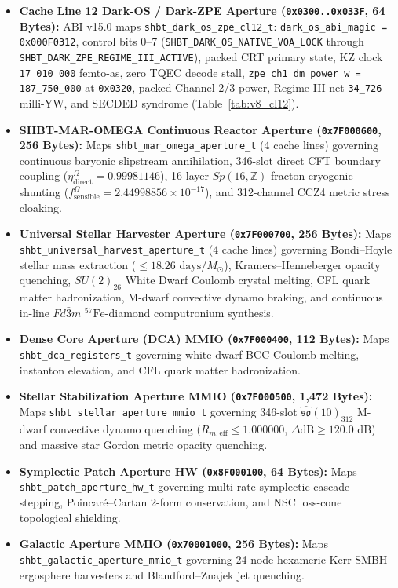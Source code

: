 \documentclass[11pt,onecolumn]{article}
\begin{document}
\begin{itemize}
    \item \textbf{Cache Line 12 Dark-OS / Dark-ZPE Aperture (\texttt{0x0300..0x033F}, 64 Bytes):} ABI v15.0 maps \texttt{shbt\_dark\_os\_zpe\_cl12\_t}: \texttt{dark\_os\_abi\_magic = 0x000F0312}, control bits 0--7 (\texttt{SHBT\_DARK\_OS\_NATIVE\_VOA\_LOCK} through \texttt{SHBT\_DARK\_ZPE\_REGIME\_III\_ACTIVE}), packed CRT primary state, KZ clock \texttt{17\_010\_000} femto-as, zero TQEC decode stall, \texttt{zpe\_ch1\_dm\_power\_w = 187\_750\_000} at \texttt{0x0320}, packed Channel-2/3 power, Regime III net \texttt{34\_726} milli-YW, and SECDED syndrome (Table~\ref{tab:v8_cl12}).
    \item \textbf{SHBT-MAR-OMEGA Continuous Reactor Aperture (\texttt{0x7F000600}, 256 Bytes):} Maps \texttt{shbt\_mar\_omega\_aperture\_t} (4 cache lines) governing continuous baryonic slipstream annihilation, 346-slot direct CFT boundary coupling ($\eta_{\text{direct}}^{\Omega} = 0.99981146$), 16-layer $Sp(16,\mathbb{Z})$ fracton cryogenic shunting ($f_{\text{sensible}}^{\Omega} = 2.44998856 \times 10^{-17}$), and 312-channel CCZ4 metric stress cloaking.
    \item \textbf{Universal Stellar Harvester Aperture (\texttt{0x7F000700}, 256 Bytes):} Maps \texttt{shbt\_universal\_harvest\_aperture\_t} (4 cache lines) governing Bondi--Hoyle stellar mass extraction ($\le 18.26\text{ days}/M_\odot$), Kramers--Henneberger opacity quenching, $SU(2)_{26}$ White Dwarf Coulomb crystal melting, CFL quark matter hadronization, M-dwarf convective dynamo braking, and continuous in-line $Fd\bar{3}m$ $^{57}\text{Fe}$-diamond computronium synthesis.
    \item \textbf{Dense Core Aperture (DCA) MMIO (\texttt{0x7F000400}, 112 Bytes):} Maps \texttt{shbt\_dca\_registers\_t} governing white dwarf BCC Coulomb melting, instanton elevation, and CFL quark matter hadronization.
    \item \textbf{Stellar Stabilization Aperture MMIO (\texttt{0x7F000500}, 1,472 Bytes):} Maps \texttt{shbt\_stellar\_aperture\_mmio\_t} governing 346-slot $\hat{\mathfrak{so}}(10)_{312}$ M-dwarf convective dynamo quenching ($R_{m,\text{eff}} \le 1.000000$, $\Delta\text{dB} \ge 120.0\text{ dB}$) and massive star Gordon metric opacity quenching.
    \item \textbf{Symplectic Patch Aperture HW (\texttt{0x8F000100}, 64 Bytes):} Maps \texttt{shbt\_patch\_aperture\_hw\_t} governing multi-rate symplectic cascade stepping, Poincar\'e--Cartan 2-form conservation, and NSC loss-cone topological shielding.
    \item \textbf{Galactic Aperture MMIO (\texttt{0x70001000}, 256 Bytes):} Maps \texttt{shbt\_galactic\_aperture\_mmio\_t} governing 24-node hexameric Kerr SMBH ergosphere harvesters and Blandford--Znajek jet quenching.

\end{itemize}
\end{document}
